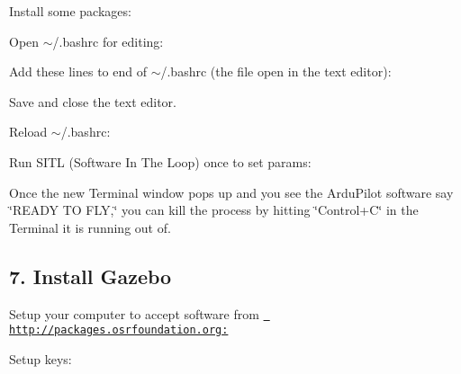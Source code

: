 Install some packages\+: 
\begin{DoxyCode}{0}
\end{DoxyCode}


Open {\ttfamily $\sim$/.bashrc} for editing\+: 
\begin{DoxyCode}{0}
\end{DoxyCode}


Add these lines to end of {\ttfamily $\sim$/.bashrc} (the file open in the text editor)\+: 
\begin{DoxyCode}{0}
\end{DoxyCode}


Save and close the text editor.

Reload {\ttfamily $\sim$/.bashrc}\+: 
\begin{DoxyCode}{0}
\end{DoxyCode}


Run S\+I\+TL (Software In The Loop) once to set params\+: 
\begin{DoxyCode}{0}
\end{DoxyCode}


Once the new Terminal window pops up and you see the Ardu\+Pilot software say \char`\"{}\+R\+E\+A\+D\+Y T\+O F\+L\+Y,\char`\"{} you can kill the process by hitting \char`\"{}\+Control+\+C\char`\"{} in the Terminal it is running out of.

\subsection*{7. Install Gazebo}

Setup your computer to accept software from \href{http://packages.osrfoundation.org:}{\texttt{ http\+://packages.\+osrfoundation.\+org\+:}} 
\begin{DoxyCode}{0}
\end{DoxyCode}


Setup keys\+: 
\begin{DoxyCode}{0}
\end{DoxyCode}


